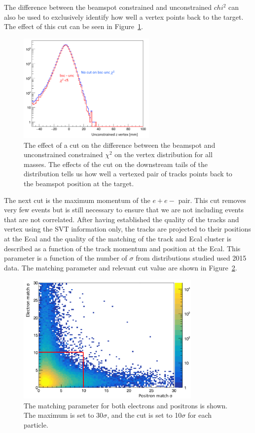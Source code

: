 \documentclass[twoside]{article}
\begin{document}
The difference between the beamspot constrained and unconstrained $chi^2$ can also be used to exclusively identify how well a vertex points back to the target. The effect of this cut can be seen in Figure~\ref{fig:bmucut}.

\begin{figure}[H]
  \centering
      \includegraphics[width=0.6\textwidth]{plots/bmuchi2.png}
  \caption{The effect of a cut on the difference between the beamspot and unconstrained constrained $\chi^2$ on the vertex distribution for all masses. The effects of the cut on the downstream tails of the distribution tells us how well a vertexed pair of tracks points back to the beamspot position at the target.}
  \label{fig:bmucut}
\end{figure} 

The next cut is the maximum momentum of the $e+e-$ pair. This cut removes very few events but is still necessary to ensure that we are not including events that are not correlated. After having established the quality of the tracks and vertex using the SVT information only, the tracks are projected to their positions at the Ecal and the quality of the matching of the track and Ecal cluster is described as a function of the track momentum and position at the Ecal. This parameter is a function of the number of $\sigma$ from distributions studied used 2015 data. The matching parameter and relevant cut value are shown in Figure~\ref{fig:matchcut}. 

\begin{figure}[H]
  \centering
      \includegraphics[width=0.8\textwidth]{plots/matchcut.png}
  \caption{The matching parameter for both electrons and positrons is shown. The maximum is set to 30$\sigma$, and the cut is set to 10$\sigma$ for each particle.}
  \label{fig:matchcut}
\end{figure} 
\end{document}
